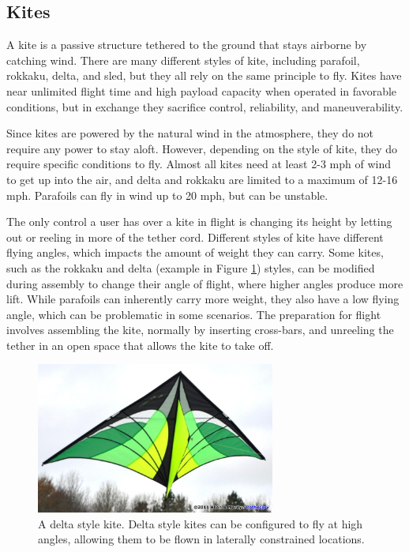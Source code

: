 \subsection{Kites}
A kite is a passive structure tethered to the ground that stays airborne by catching wind\cite{kite_book}. There are many different styles of kite, including parafoil, rokkaku, delta, and sled, but they all rely on the same principle to fly\cite{kite_book}\cite{kite_iqp}. Kites have near unlimited flight time and high payload capacity when operated in favorable conditions, but in exchange they sacrifice control, reliability, and maneuverability.\par
Since kites are powered by the natural wind in the atmosphere, they do not require any power to stay aloft. However, depending on the style of kite, they do require specific conditions to fly. Almost all kites need at least 2-3 mph of wind to get up into the air, and delta and rokkaku are limited to a maximum of 12-16 mph\cite{kite_iqp}. Parafoils can fly in wind up to 20 mph, but can be unstable.\par
The only control a user has over a kite in flight is changing its height by letting out or reeling in more of the tether cord. Different styles of kite have different flying angles, which impacts the amount of weight they can carry. Some kites, such as the rokkaku and delta (example in Figure \ref{fig:delta_kite}) styles, can be modified during assembly to change their angle of flight, where higher angles produce more lift. While parafoils can inherently carry more weight, they also have a low flying angle, which can be problematic in some scenarios. The preparation for flight involves assembling the kite, normally by inserting cross-bars, and unreeling the tether in an open space that allows the kite to take off.\par
\begin{figure}[ht]
\centering
\includegraphics[width=0.70\textwidth]{img/delta-kite.jpg}
\caption{A delta style kite. Delta style kites can be configured to fly at high angles, allowing them to be flown in laterally constrained locations.}
\label{fig:delta_kite}
\end{figure}\par
